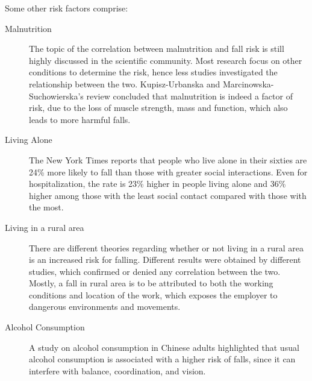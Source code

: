 Some other risk factors comprise:
\begin{description}
  \item[Malnutrition] The topic of the correlation between malnutrition and fall risk is still highly discussed in the scientific community. Most research focus on other conditions to determine the risk, hence less studies investigated the relationship between the two. Kupisz-Urbanska and Marcinowska-Suchowierska's review \cite{MalnutritionRisk} concluded that malnutrition is indeed a factor of risk, due to the loss of muscle strength, mass and function, which also leads to more harmful falls.
  \item[Living Alone] The New York Times \cite{AloneRisk} reports that people who live alone in their sixties are 24\% more likely to fall than those with greater social interactions. Even for hospitalization, the rate is 23\% higher in people living alone and 36\% higher among those with the least social contact compared with those with the most.
  \item[Living in a rural area] There are different theories regarding whether or not living in a rural area is an increased risk for falling. Different results were obtained by different studies, which confirmed or denied any correlation between the two. Mostly, a fall in rural area is to be attributed to both the working conditions and location of the work, which exposes the employer to dangerous environments and movements.
  \item[Alcohol Consumption] A study on alcohol consumption in Chinese adults \cite{AlcoholRisk} highlighted that usual alcohol consumption is associated with a higher risk of falls, since it can interfere with balance, coordination, and vision.
\end{description}

